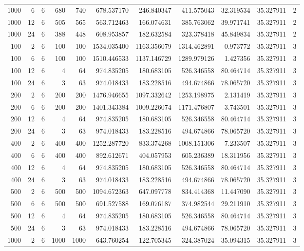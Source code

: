 \begin{table}
\begin{tabular}{rrrrrrrrrrr}
1000 & 6 & 6 & 680 & 740 & 678.537170 & 246.840347 & 411.575043 & 32.319534 & 35.327911 & 2 \\
1000 & 12 & 6 & 505 & 565 & 563.712463 & 166.074631 & 385.763062 & 39.971741 & 35.327911 & 2 \\
1000 & 24 & 6 & 388 & 448 & 608.953857 & 182.632584 & 323.378418 & 45.849834 & 35.327911 & 2 \\
100 & 2 & 6 & 100 & 100 & 1534.035400 & 1163.356079 & 1314.462891 & 0.973772 & 35.327911 & 3 \\
100 & 6 & 6 & 100 & 100 & 1510.446533 & 1137.146729 & 1289.979126 & 1.427356 & 35.327911 & 3 \\
100 & 12 & 6 & 4 & 64 & 974.835205 & 180.683105 & 526.346558 & 80.464714 & 35.327911 & 3 \\
100 & 24 & 6 & 3 & 63 & 974.018433 & 183.228516 & 494.674866 & 78.065720 & 35.327911 & 3 \\
200 & 2 & 6 & 200 & 200 & 1476.946655 & 1097.332642 & 1253.198975 & 2.131419 & 35.327911 & 3 \\
200 & 6 & 6 & 200 & 200 & 1401.343384 & 1009.226074 & 1171.476807 & 3.743501 & 35.327911 & 3 \\
200 & 12 & 6 & 4 & 64 & 974.835205 & 180.683105 & 526.346558 & 80.464714 & 35.327911 & 3 \\
200 & 24 & 6 & 3 & 63 & 974.018433 & 183.228516 & 494.674866 & 78.065720 & 35.327911 & 3 \\
400 & 2 & 6 & 400 & 400 & 1252.287720 & 833.374268 & 1008.151306 & 7.233507 & 35.327911 & 3 \\
400 & 6 & 6 & 400 & 400 & 892.612671 & 404.057953 & 605.236389 & 18.311956 & 35.327911 & 3 \\
400 & 12 & 6 & 4 & 64 & 974.835205 & 180.683105 & 526.346558 & 80.464714 & 35.327911 & 3 \\
400 & 24 & 6 & 3 & 63 & 974.018433 & 183.228516 & 494.674866 & 78.065720 & 35.327911 & 3 \\
500 & 2 & 6 & 500 & 500 & 1094.672363 & 647.097778 & 834.414368 & 11.447090 & 35.327911 & 3 \\
500 & 6 & 6 & 500 & 500 & 691.527588 & 169.076187 & 374.982544 & 29.211910 & 35.327911 & 3 \\
500 & 12 & 6 & 4 & 64 & 974.835205 & 180.683105 & 526.346558 & 80.464714 & 35.327911 & 3 \\
500 & 24 & 6 & 3 & 63 & 974.018433 & 183.228516 & 494.674866 & 78.065720 & 35.327911 & 3 \\
1000 & 2 & 6 & 1000 & 1000 & 643.760254 & 122.705345 & 324.387024 & 35.094315 & 35.327911 & 3 \\

\end{tabular}
\end{table}
